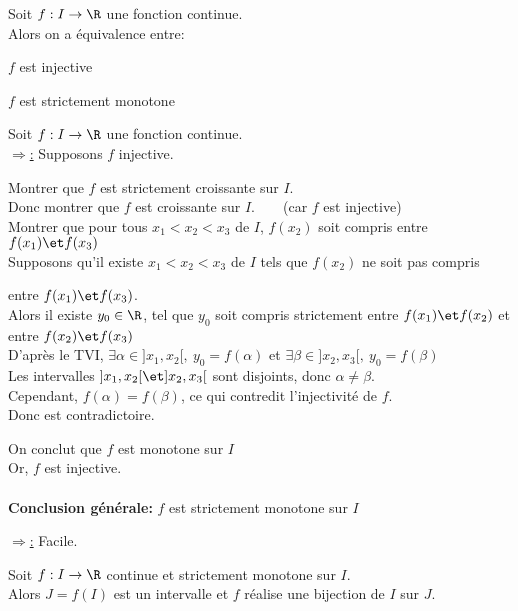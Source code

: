 \documentclass[12pt,twoside,a4paper]{article}
\begin{document}
		\newpage
		\begin{prop}
			Soit $f:I\rightarrow \R$ une fonction continue.\\
			Alors on a \'equivalence entre:
			\begin{liste}
				\item[\cercle1] $f$ est injective
				\item[\cercle2] $f$ est strictement monotone
			\end{liste}
		\end{prop}
		\begin{preuve}
			Soit $f:I\rightarrow \R$ une fonction continue.\\
			\underline{$\Rightarrow$:} Supposons $f$ injective.
			\begin{tab}
				Montrer que $f$ est strictement croissante sur $I$.\\
				Donc montrer que $f$ est croissante sur $I$.\ \ \ \ (car $f$ est injective)\\
				Montrer que pour tous $x_1<x_2<x_3$ de $I$, $f(x_2)$ soit compris entre $f(x_1)\et f(x_3)$\\
				 Supposons qu'il existe $x_1<x_2<x_3$ de $I$ tels que $f(x_2)$ ne soit pas compris
				\begin{tab}
					entre $f(x_1)\et f(x_3)$.\\
					Alors il existe $y_0\in\R$, tel que $y_0$ soit compris strictement entre $f(x_1) \et f(x_2)$ et entre $f(x_2) \et f(x_3)$\\
					D'apr\`es le TVI, $\exists \alpha\in]x_1,x_2[,\ y_0=f(\alpha)$ et $\exists \beta\in]x_2,x_3[,\ y_0=f(\beta)$\\
					Les intervalles $]x_1,x_2[\et]x_2,x_3[$ sont disjoints, donc $\alpha\neq\beta$.\\
					Cependant, $f(\alpha)=f(\beta)$, ce qui contredit l'injectivit\'e de $f$.\\
					Donc  est contradictoire.
				\end{tab}
				On conclut que $f$ est monotone sur $I$\\
				Or, $f$ est injective.\\
				\\
				\textbf{Conclusion g\'en\'erale:} $f$ est strictement monotone sur $I$
			\end{tab}
			\underline{$\Rightarrow$:} Facile.
		\end{preuve}
		\begin{coro}
			Soit $f:I\rightarrow\R$ continue et strictement monotone sur $I$.\\
			Alors $J=f(I)$ est un intervalle et $f$ r\'ealise une bijection de $I$ sur $J$.
		\end{coro}
\end{document}
